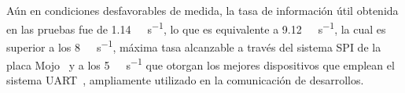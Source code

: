 Aún en condiciones desfavorables de medida, la tasa de información útil obtenida en las pruebas fue de \SI{1,14}{\mega\byte\per\second}, lo que es equivalente a \SI{9,12}{\mega\bit\per\second}, la cual es superior a los \SI{8}{\mega\bit\per\second}, máxima tasa alcanzable a través del sistema SPI de la placa Mojo~\cite{Atmel2016} y a los \SI{5}{\mega\bit\per\second} que otorgan los mejores dispositivos que emplean el sistema UART~\cite{TexasInstrument2013}, ampliamente utilizado en la comunicación de desarrollos.
%
%
%
%
%
%
